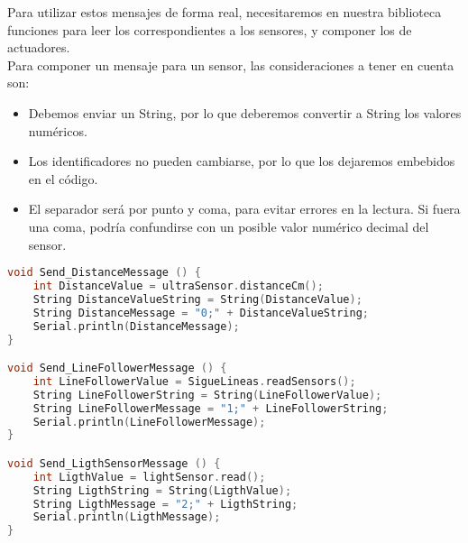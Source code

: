 Para utilizar estos mensajes de forma real, necesitaremos en nuestra biblioteca funciones para leer los correspondientes a los sensores, y  componer los de actuadores. \\
Para componer un mensaje para un sensor, las consideraciones a tener en cuenta son: 
\begin{itemize}
	\item Debemos enviar un String, por lo que deberemos convertir a String los valores numéricos.
	\item Los identificadores no pueden cambiarse, por lo que los dejaremos embebidos en el código.
	\item El separador será por punto y coma, para evitar errores en la lectura. Si fuera una coma, podría confundirse con un posible valor numérico decimal del sensor.
\end{itemize} 
\begin{lstlisting}[language=C,caption={Envío de mensajes para los sensores},captionpos=b]
void Send_DistanceMessage () {
	int DistanceValue = ultraSensor.distanceCm();
	String DistanceValueString = String(DistanceValue);
	String DistanceMessage = "0;" + DistanceValueString; 
	Serial.println(DistanceMessage);
}

void Send_LineFollowerMessage () {
	int LineFollowerValue = SigueLineas.readSensors();
	String LineFollowerString = String(LineFollowerValue);
	String LineFollowerMessage = "1;" + LineFollowerString; 
	Serial.println(LineFollowerMessage);
}

void Send_LigthSensorMessage () {
	int LigthValue = lightSensor.read();
	String LigthString = String(LigthValue);
	String LigthMessage = "2;" + LigthString; 
	Serial.println(LigthMessage);
}
\end{lstlisting}

